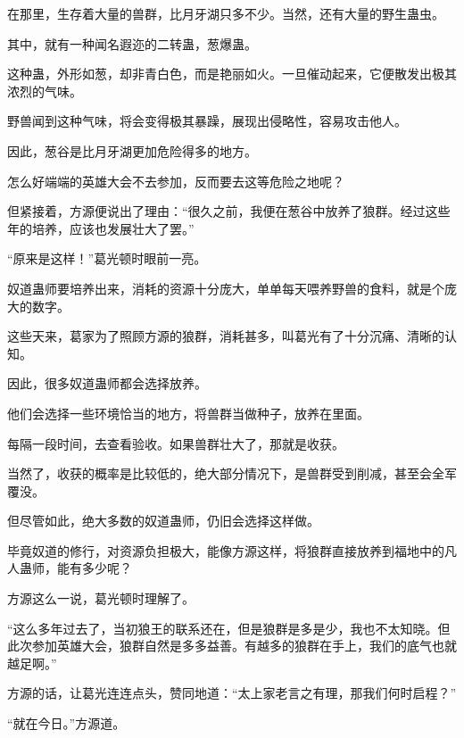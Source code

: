 \begin{this_body}
在那里，生存着大量的兽群，比月牙湖只多不少。当然，还有大量的野生蛊虫。

其中，就有一种闻名遐迩的二转蛊，葱爆蛊。

这种蛊，外形如葱，却非青白色，而是艳丽如火。一旦催动起来，它便散发出极其浓烈的气味。

野兽闻到这种气味，将会变得极其暴躁，展现出侵略性，容易攻击他人。

因此，葱谷是比月牙湖更加危险得多的地方。

怎么好端端的英雄大会不去参加，反而要去这等危险之地呢？

但紧接着，方源便说出了理由：“很久之前，我便在葱谷中放养了狼群。经过这些年的培养，应该也发展壮大了罢。”

“原来是这样！”葛光顿时眼前一亮。

奴道蛊师要培养出来，消耗的资源十分庞大，单单每天喂养野兽的食料，就是个庞大的数字。

这些天来，葛家为了照顾方源的狼群，消耗甚多，叫葛光有了十分沉痛、清晰的认知。

因此，很多奴道蛊师都会选择放养。

他们会选择一些环境恰当的地方，将兽群当做种子，放养在里面。

每隔一段时间，去查看验收。如果兽群壮大了，那就是收获。

当然了，收获的概率是比较低的，绝大部分情况下，是兽群受到削减，甚至会全军覆没。

但尽管如此，绝大多数的奴道蛊师，仍旧会选择这样做。

毕竟奴道的修行，对资源负担极大，能像方源这样，将狼群直接放养到福地中的凡人蛊师，能有多少呢？

方源这么一说，葛光顿时理解了。

“这么多年过去了，当初狼王的联系还在，但是狼群是多是少，我也不太知晓。但此次参加英雄大会，狼群自然是多多益善。有越多的狼群在手上，我们的底气也就越足啊。”

方源的话，让葛光连连点头，赞同地道：“太上家老言之有理，那我们何时启程？”

“就在今日。”方源道。

\end{this_body}

